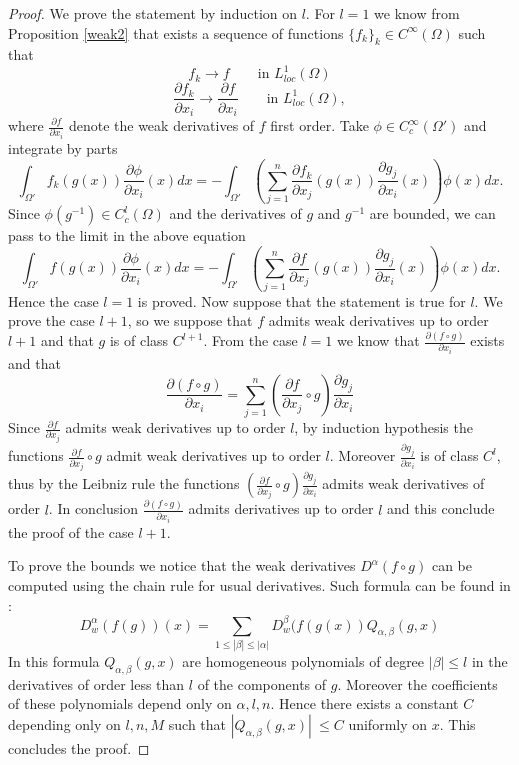 \documentclass[12pt]{article}
\theoremstyle{definition}
\begin{document}
\begin{proof}
We prove the statement by induction on $l$. For $l=1$ we know from Proposition \ref{weak2} that exists a sequence of functions $\{f_k\}_k  \in C^\infty(\Omega)$ such that
\[ f_k \rightarrow f \qquad \text{in } L^1_{loc}(\Omega) \]
\[ \frac{\partial f_k }{\partial x_i}\rightarrow \frac{\partial f }{\partial x_i} \qquad \text{in } L^1_{loc}(\Omega),\]
where $\frac{\partial f }{\partial x_i}$ denote the weak derivatives of $f$ first order. Take $\phi \in C^\infty_c(\Omega')$ and integrate by parts
\[\int_{\Omega'} f_k(g(x))\frac{\partial \phi }{\partial x_i}(x)dx = - \int_{\Omega'} \left(\sum_{j=1}^n \frac{\partial f_k }{\partial x_j}(g(x))\frac{\partial g_j }{\partial x_i}(x)\right)\phi(x)dx.\]
Since $\phi(g^{-1}) \in C^l_c(\Omega)$ and the derivatives of $g$ and $g^{-1}$ are bounded, we can pass to the limit in the above equation
\[\int_{\Omega'} f(g(x))\frac{\partial \phi }{\partial x_i}(x)dx = - \int_{\Omega'} \left(\sum_{j=1}^n \frac{\partial f }{\partial x_j}(g(x))\frac{\partial g_j }{\partial x_i}(x)\right)\phi(x)dx.\]
Hence the case $l=1$ is proved. Now suppose that the statement is true for $l$. We prove the case $l+1$, so we suppose that $f$ admits weak derivatives up to order $l+1$ and that $g$ is of class $C^{l+1}$. From the case $l=1$ we know that $\frac{\partial (f \circ g) }{\partial x_i}$ exists and that
\[ \frac{\partial (f \circ g) }{\partial x_i}= \sum_{j=1}^n (\frac{\partial f }{\partial x_j} \circ g)\frac{\partial g_j }{\partial x_i}\] 
Since $\frac{\partial f }{\partial x_j}$ admits weak derivatives up to order $l$, by induction hypothesis the functions $\frac{\partial f }{\partial x_j} \circ g$ admit weak derivatives up to order $l$. Moreover $\frac{\partial g_j }{\partial x_i}$ is of class $C^l$, thus by the Leibniz rule the functions $(\frac{\partial f }{\partial x_j} \circ g)\frac{\partial g_j }{\partial x_i}$ admits weak derivatives of order $l$. In conclusion $\frac{\partial (f \circ g) }{\partial x_i}$ admits derivatives up to order $l$ and this conclude the proof of the case $l+1$. 

To prove the bounds we notice that the weak derivatives $D^\alpha (f \circ g)$ can be computed using the chain rule for usual derivatives. Such formula can be found in \cite[formula B] {fraenkel}:
\[ D^{\alpha}_w(f(g))(x) = \sum_{1\le |\beta|\le|\alpha| }D^{\beta}_w(f(g(x)) Q_{\alpha,\beta}(g,x)\]
In this formula $Q_{\alpha,\beta}(g,x)$ are homogeneous polynomials of degree $|\beta|\le l$ in the derivatives of order less than $l$ of the components of $g$. Moreover the coefficients of these polynomials depend only on $\alpha,l,n$. Hence there exists a constant $C$ depending only on $l,n,M$ such that $|Q_{\alpha,\beta}(g,x)|\ \le C$ uniformly on $x$. This concludes the proof.
\end{proof}
\end{document}
